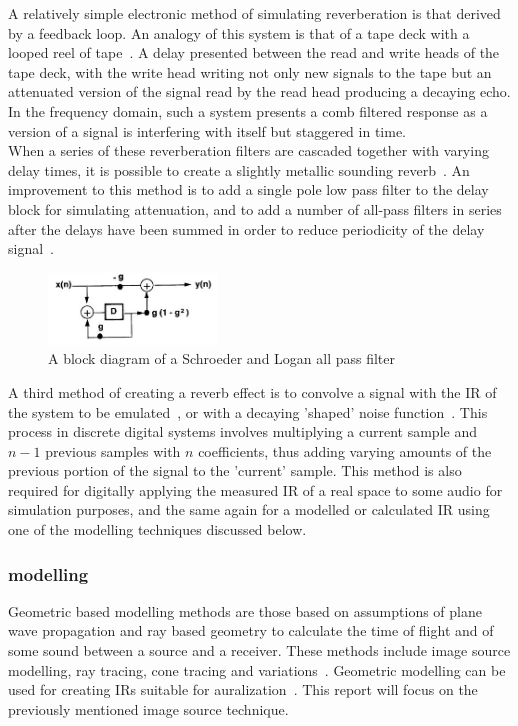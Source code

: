 \documentclass[paper=a4, fontsize=10pt, font=arial]{scrartcl} %
\numberwithin{equation}{section} %
\numberwithin{figure}{section} %
\numberwithin{table}{section} %
\begin{document}
A relatively simple electronic method of simulating reverberation is that derived by a feedback loop. An analogy of this system is that of a tape deck with a looped reel of tape~\cite{Begault1995}. A delay presented between the read and write heads of the tape deck, with the write head writing not only new signals to the tape but an attenuated version of the signal read by the read head producing a decaying echo. In the frequency domain, such a system presents a comb filtered response as a version of a signal is interfering with itself but staggered in time.\\ 
When a series of these reverberation filters are cascaded together with varying delay times, it is possible to create a slightly metallic sounding reverb~\cite{Begault1995}. An improvement to this method is to add a single pole low pass filter to the delay block for simulating attenuation, and to add  a number of all-pass filters in series after the delays have been summed in order to reduce periodicity of the delay signal~\cite{Logan1961}.\\

\begin{figure}[H]
\centering
\includegraphics[width=0.4\textwidth]{apfblockdiagram.jpg}
\caption{A block diagram of a Schroeder and Logan all pass filter\cite{Begault1995}}
\end{figure}

A third method of creating a reverb effect is to convolve a signal with the IR of the system to be emulated~\cite{Lee2010}, or with a decaying 'shaped' noise function~\cite{Lien2016}. This process in discrete digital systems involves multiplying a current sample and $n-1$ previous samples with $n$ coefficients, thus adding varying amounts of the previous portion of the signal to the 'current' sample. This method is also required for digitally applying the measured IR of a real space to some audio for simulation purposes, and the same again for a modelled or calculated IR using one of the modelling techniques discussed below. 

\subsubsection{modelling}
Geometric based modelling methods are those based on assumptions of plane wave propagation and ray based geometry to calculate the time of flight and  of some sound between a source and a receiver. These methods include image source modelling, ray tracing, cone tracing and variations~\cite{Elorza2005}. Geometric modelling can be used for creating IRs suitable for auralization~\cite{Oxnard2012}. This report will focus on the previously mentioned image source technique.\\
\end{document}
